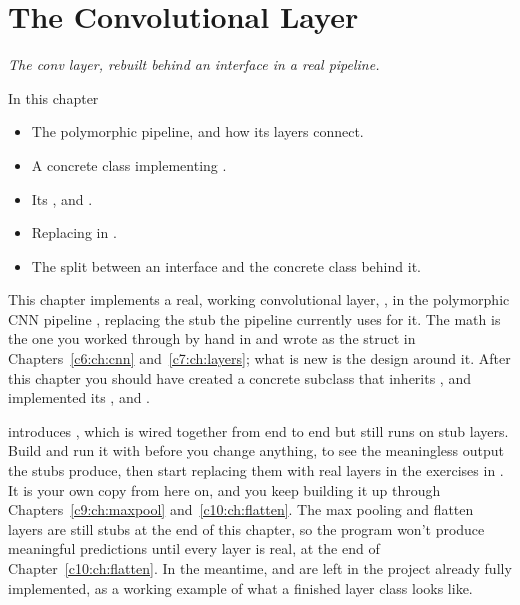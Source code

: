 
\chapter{The Convolutional Layer}
\label{c8:ch:conv}

{\large\itshape The conv layer, rebuilt behind an interface in a real pipeline.\par}

\begin{chapterbox}{In this chapter}
\begin{itemize}
  \item The polymorphic  pipeline, and how its layers connect.
  \item A concrete class  implementing .
  \item Its ,  and .
  \item Replacing  in .
  \item The split between an interface and the concrete class behind it.
\end{itemize}
\end{chapterbox}

This chapter implements a real, working convolutional layer, , in the
polymorphic CNN pipeline , replacing the stub the pipeline currently uses for it. The
math is the one you worked through by hand in  and wrote as the struct
 in Chapters~\ref{c6:ch:cnn} and~\ref{c7:ch:layers}; what is new is the design
around it. After this chapter you should have created a concrete subclass  that
inherits , and implemented its ,
 and .

 introduces , which is wired together from end to end but
still runs on stub layers. Build and run it with  before you change anything, to see the
meaningless output the stubs produce, then start replacing them with real layers in the exercises
in . It is your own copy from here on, and you keep building it up through
Chapters~\ref{c9:ch:maxpool} and~\ref{c10:ch:flatten}. The max pooling and flatten layers are still
stubs at the end of this chapter, so the program won't produce meaningful predictions until every
layer is real, at the end of Chapter~\ref{c10:ch:flatten}. In the meantime,  and
 are left in the project already fully implemented, as a working example of what a
finished layer class looks like.




